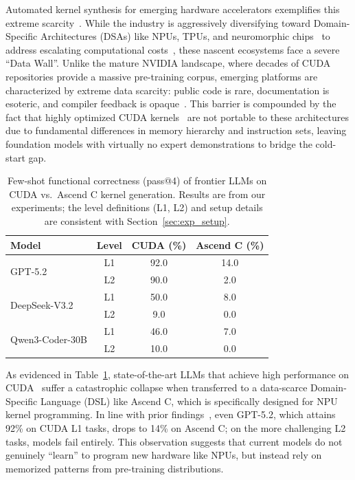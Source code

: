 \documentclass{article} %
\theoremstyle{definition}
\theoremstyle{remark}
\begin{document}
Automated kernel synthesis for emerging hardware accelerators exemplifies this extreme scarcity~\citep{yu2026towards}. While the industry is aggressively diversifying toward Domain-Specific Architectures (DSAs) like NPUs, TPUs, and neuromorphic chips~\citep{silvano2025survey, liao2021ascend, jouppi2023tpu} to address escalating computational costs~\citep{kaplan2020scaling}, these nascent ecosystems face a severe ``Data Wall''. Unlike the mature NVIDIA landscape, where decades of CUDA repositories provide a massive pre-training corpus, emerging platforms are characterized by extreme data scarcity: public code is rare, documentation is esoteric, and compiler feedback is opaque~\citep{joel2410survey}. This barrier is compounded by the fact that highly optimized CUDA kernels~\citep{choquette2021nvidia, wu2023pytorch} are not portable to these architectures due to fundamental differences in memory hierarchy and instruction sets, leaving foundation models with virtually no expert demonstrations to bridge the cold-start gap.

\begin{table}[t]
    \centering
    \caption{Few-shot functional correctness (pass@4) of frontier LLMs on CUDA vs.\ Ascend C kernel generation. Results are from our experiments; the level definitions (L1, L2) and setup details are consistent with Section~\ref{sec:exp_setup}.}
    \label{tab:cuda_vs_ascendc}
    \setlength{\tabcolsep}{12pt}
    \begin{tabular}{lccc}
      \toprule
      \textbf{Model} & \textbf{Level} & \textbf{CUDA (\%)} & \textbf{Ascend C (\%)} \\
      \midrule
      \multirow{2}{*}{GPT-5.2}
        & L1 & 92.0 & 14.0 \\
        & L2 & 90.0 & 2.0 \\
      \midrule
      \multirow{2}{*}{DeepSeek-V3.2}
        & L1 & 50.0 & 8.0 \\
        & L2 & 9.0 & 0.0 \\
      \midrule
      \multirow{2}{*}{Qwen3-Coder-30B}
        & L1 & 46.0 & 7.0 \\
        & L2 & 10.0 & 0.0 \\
      \bottomrule
    \end{tabular}
\end{table}

As evidenced in Table~\ref{tab:cuda_vs_ascendc}, state-of-the-art LLMs that achieve high performance on CUDA~\citep{ouyang2025kernel} suffer a catastrophic collapse when transferred to a data-scarce Domain-Specific Language (DSL) like Ascend C, which is specifically designed for NPU kernel programming. In line with prior findings~\citep{wen2025multikernelbench}, even GPT-5.2, which attains 92\% on CUDA L1 tasks, drops to 14\% on Ascend C; on the more challenging L2 tasks, models fail entirely. This observation suggests that current models do not genuinely ``learn'' to program new hardware like NPUs, but instead rely on memorized patterns from pre-training distributions.
\end{document}
